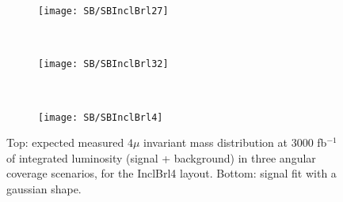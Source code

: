 \documentclass[a4paper,twoside,12pt]{book}
\begin{document}
\begin{figure}
\begin{subfigure}{\linewidth}
\centering
\texttt{[image: SB/SBInclBrl27]}
\caption{}
\label{fig:SBInclBrl27}
\end{subfigure}\\[1ex]
\begin{subfigure}{\linewidth}
\centering
\texttt{[image: SB/SBInclBrl32]}
\caption{}
\label{fig:SBInclBrl32}
\end{subfigure}\\[1ex]
\begin{subfigure}{\linewidth}
\centering
\texttt{[image: SB/SBInclBrl4]}
\caption{}
\label{fig:SBInclBrl4}
\end{subfigure}
\caption{Top: expected measured $4\mu$ invariant mass distribution at 3000 fb$^{-1}$ of integrated luminosity (signal + background) in
	three angular coverage scenarios, for the InclBrl4 layout. Bottom: signal fit with a gaussian shape.	 }
\label{fig:SB}
\end{figure}
\end{document}
